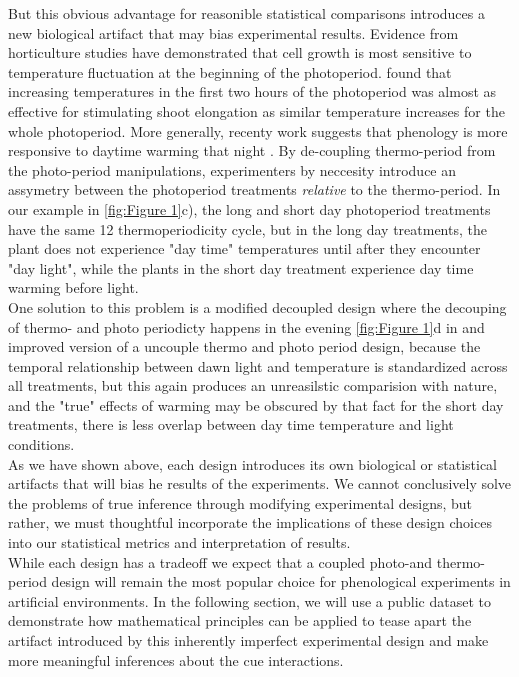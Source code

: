 \documentclass{article}[11pt]
\begin{document}
\noindent But this obvious advantage for reasonible statistical comparisons introduces a new biological artifact that may bias experimental results. Evidence from horticulture studies have demonstrated that cell growth is most sensitive to temperature fluctuation at the beginning of the photoperiod\citep{Erwin1998}. \citet{Erwin1998} found that increasing temperatures in the first two hours of the photoperiod was almost as effective for stimulating shoot elongation as similar temperature increases for the whole photoperiod. More generally, recenty work suggests that phenology is more responsive to daytime warming that night \citep{Rossi2017}. By de-coupling thermo-period from the photo-period manipulations, experimenters by neccesity introduce an assymetry between the photoperiod treatments \textit{relative} to the thermo-period. In our example in \ref{fig:Figure 1}c), the long and short day photoperiod treatments have the same 12 thermoperiodicity cycle, but in the long day treatments, the plant does not experience "day time" temperatures until after they encounter "day light", while the plants in the short day treatment experience day time warming before light.\\

\noindent One solution to this problem is a modified decoupled design where the decouping of thermo- and photo periodicty happens in the evening \ref{fig:Figure 1}d in and improved version of a uncouple thermo and photo period design, because the temporal relationship between dawn light and temperature is standardized across all treatments, but this again produces an unreasilstic comparision with nature, and the "true" effects of warming may be obscured by that fact for the short day treatments, there is less overlap between day time temperature and light conditions.\\ %

\indent As we have shown above, each design introduces its own biological or statistical artifacts that will bias he results of the experiments. We cannot conclusively solve the problems of true inference through modifying experimental designs, but rather, we must thoughtful incorporate the implications of these design choices into our statistical metrics and interpretation of results.\\ 

\noindent While each design has a tradeoff we expect that a coupled photo-and thermo- period design will remain the most popular choice for phenological experiments in artificial environments. In the following section, we will use a public dataset to demonstrate how mathematical principles can be applied to tease apart the artifact introduced by this inherently imperfect experimental design and make more meaningful inferences about the cue interactions. 
\end{document}
